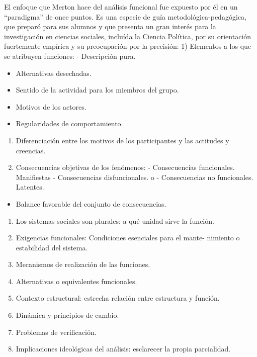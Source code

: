 \documentclass[
]{book}
\providecommand{\tightlist}{%
  \setlength{\itemsep}{0pt}\setlength{\parskip}{0pt}}
\begin{document}
El enfoque que Merton hace del análisis funcional fue expuesto por él en un ``paradigma'' de once puntos. Es una especie de guía metodológica-pedagógica, que preparó para sus alumnos y que presenta un gran interés para la investigación en ciencias sociales, incluída la Ciencia Política, por su orientación fuertemente empírica y su preocupación por la precisión: 1) Elementos a los que se atribuyen funciones: - Descripción pura.

\begin{itemize}
\item
  Alternativas desechadas.
\item
  Sentido de la actividad para los miembros del grupo.
\item
  Motivos de los actores.
\item
  Regularidades de comportamiento.
\end{itemize}

\begin{enumerate}
\def\labelenumi{\arabic{enumi})}
\setcounter{enumi}{1}
\item
  Diferenciación entre los motivos de los participantes y las actitudes y creencias.
\item
  Consecuencias objetivas de los fenómenos: - Consecuencias funcionales. \textbar{} Manifiestas - Consecuencias disfuncionales. \textbar{} o - Consecuencias no funcionales. \textbar{} Latentes.
\end{enumerate}

\begin{itemize}
\tightlist
\item
  Balance favorable del conjunto de consecuencias.
\end{itemize}

\begin{enumerate}
\def\labelenumi{\arabic{enumi})}
\setcounter{enumi}{3}
\item
  Los sistemas sociales son plurales: a qué unidad sirve la función.
\item
  Exigencias funcionales: Condiciones esenciales para el mante- nimiento o estabilidad del sistema.
\item
  Mecanismos de realización de las funciones.
\item
  Alternativas o equivalentes funcionales.
\item
  Contexto estructural: estrecha relación entre estructura y función.
\item
  Dinámica y principios de cambio.
\item
  Problemas de verificación.
\item
  Implicaciones ideológicas del análisis: esclarecer la propia parcialidad.
\end{enumerate}
\end{document}
